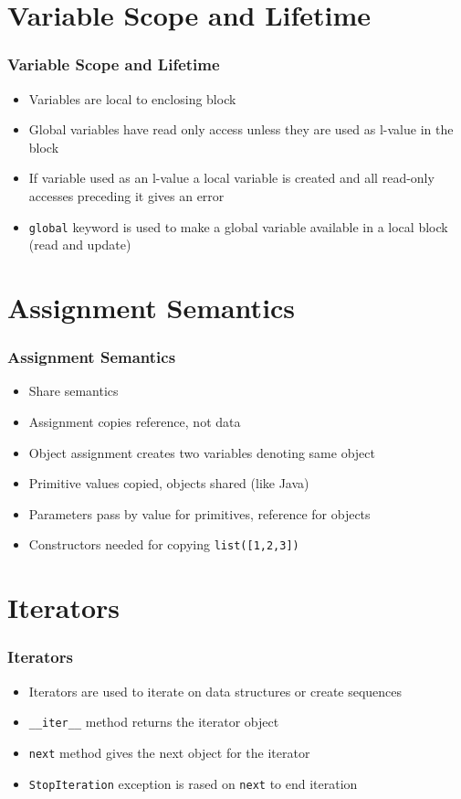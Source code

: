 \documentclass[trans,compress,xcolor=table]{beamer}
\begin{document}
\section{Variable Scope and Lifetime}
\begin{frame}
\frametitle{Variable Scope and Lifetime}
\begin{itemize}
\item Variables are local to enclosing block
\item Global variables have read only access unless
	they are used as l-value in the block
\item If variable used as an l-value a local variable
	is created and all read-only accesses preceding
	it gives an error
\item \lstinline'global' keyword is used to make a global variable
	available in a local block (read and update)
\end{itemize}
\end{frame}


\section{Assignment Semantics}
\begin{frame}
\frametitle{Assignment Semantics}
\begin{itemize}
\item Share semantics
\item Assignment copies reference, not data
\item Object assignment creates two variables denoting
	same object
\item Primitive values copied, objects shared (like Java)
\item Parameters pass by value for primitives, reference for
	objects
\item Constructors needed for copying \lstinline!list([1,2,3])!
\end{itemize}
\end{frame}

\section{Iterators}
\begin{frame}
\frametitle{Iterators}
\begin{itemize}
\item Iterators are used to iterate on data structures or create
	sequences
\item \lstinline!__iter__! method returns the iterator object
\item \lstinline!next! method gives the next object for the iterator
\item \lstinline!StopIteration! exception is rased on \lstinline!next! to
	end iteration
\end{itemize}
\end{frame}
\end{document}

